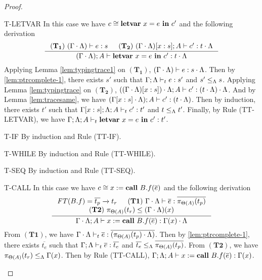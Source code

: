 {{{\begin{proof}
\begin{ProofEnumDesc}
\item[T-LETVAR] %
In this case we have $c \cong \lcLETVAR{x}{e}{c'}$ and the following derivation
\begin{equation*}
\inference
{(\mathbf{T_1}) ~(\Gamma\cdot\trace) \vdash e : s &
(\mathbf{T_2}) ~(\Gamma\cdot\trace)[x:s]; A \vdash c' : t\cdot\trace }
{(\Gamma\cdot\trace); A\vdash \lcLETVAR{x}{e}{c'} :  t\cdot\trace}
\end{equation*}
Applying Lemma \ref{lem:typingtrace1} on $(\mathbf{T_1})$, $(\Gamma\cdot\trace) \vdash e : s\cdot\trace$.
Then by \ref{lem:ptrcomplete-1},  there exists $s'$ such that $\Gamma;\trace \vdash_{t} e : s'$ and $s' \leq_{\trace} s$.
Applying Lemma \ref{lem:typingtrace} on $(\mathbf{T_2})$, $((\Gamma\cdot\trace)[x:s])\cdot\trace; A \vdash c' : (t\cdot\trace)\cdot\trace$.
And by Lemma \ref{lem:tracesame}, we have $(\Gamma[x:s]\cdot\trace); A \vdash c' : (t\cdot\trace)$.
Then by induction, there exists $t'$ such that $\Gamma[x:s]; \trace; A \vdash_{t} c' : t' $ and $t \leq_{\trace} t'$.
Finally, by Rule {(TT-LETVAR)}, we have $\Gamma; \trace; A \vdash_{t} \lcLETVAR{x}{e}{c'} : t' $.

\item[T-IF] By induction and Rule {(TT-IF)}.
\item[T-WHILE] By induction and Rule {(TT-WHILE)}.
\item[T-SEQ] By induction and Rule {(TT-SEQ)}.

\item[T-CALL] In this case we have $c \cong \lcCALL{x}{B.f}{\overline{e}}$ and the following derivation
\begin{equation*}
\inference
{
\FT(B.f) = \overline{t_p} \xrightarrow{} t_r  &
(\mathbf{T1})~\Gamma\cdot \trace \vdash \overline{e} : \overline{\app{t_p}{\Theta(A)}} \\
(\mathbf{T2})~\app{t_r}{\Theta(A)}\leq (\Gamma\cdot\trace)(x)
}
{\Gamma\cdot \trace; A \vdash \lcCALL{x}{B.f}{\overline{e}} : \Gamma(x)\cdot \trace}
\end{equation*}
From $(\mathbf{T1})$, we have $\Gamma\cdot \trace \vdash_{t} \overline{e} : \overline{(\app{t_p}{\Theta(A)}\cdot\trace)}$.
Then by \ref{lem:ptrcomplete-1}, there exists $\overline{t_e}$ such that $\Gamma;\trace \vdash_{t} \overline{e} : \overline{t_e}$ and $\overline{t_e}\leq_{\trace}  \overline{\app{t_p}{\Theta(A)}}$.
From $(\mathbf{T2})$, we have $\app{t_r}{\Theta(A)}\leq_{\trace} \Gamma(x)$.
Then by Rule {(TT-CALL)}, $\Gamma;\trace; A \vdash \lcCALL{x}{B.f}{\overline{e}}: \Gamma(x)$.


\end{ProofEnumDesc}
\end{proof}}}}
